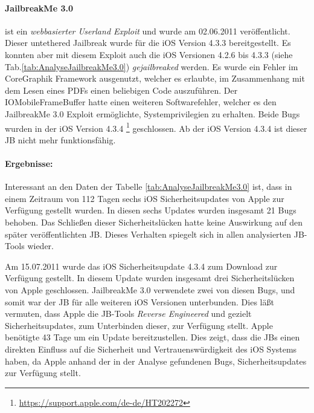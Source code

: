 \paragraph{JailbreakMe 3.0} ist ein \textit{\glqq webbasierter Userland Exploit\grqq{}} und wurde am 02.06.2011 veröffentlicht. Dieser untethered Jailbreak wurde für die iOS Version 4.3.3 bereitgestellt. Es konnten aber mit diesem Exploit auch die iOS Versionen 4.2.6 bis 4.3.3 (siehe Tab.\ref{tab:AnalyseJailbreakMe3.0})  \textit{\glqq gejailbreaked\grqq{}} werden. 
Es wurde ein Fehler im CoreGraphik Framework ausgenutzt, welcher es erlaubte, im Zusammenhang mit dem Lesen eines PDFs einen beliebigen Code auszuführen. Der IOMobileFrameBuffer hatte einen weiteren Softwarefehler, welcher es den JailbreakMe 3.0 Exploit ermöglichte, Systemprivilegien zu erhalten. Beide Bugs wurden in der iOS Version 4.3.4 \footnote{\label{foot:iOS4.3.4}{\url{https://support.apple.com/de-de/HT202272}}} geschlossen. Ab der iOS Version 4.3.4 ist dieser JB nicht mehr funktionsfähig.
 
\paragraph{Ergebnisse:} Interessant an den Daten der Tabelle \ref{tab:AnalyseJailbreakMe3.0} ist, dass in einem Zeitraum von 112 Tagen sechs iOS Sicherheitsupdates von Apple zur Verfügung gestellt wurden. In diesen sechs Updates wurden insgesamt 21 Bugs behoben. Das Schließen dieser Sicherheitslücken hatte keine Auswirkung auf den später veröffentlichten JB. Dieses Verhalten spiegelt sich in allen analysierten JB-Tools wieder. \par  
Am 15.07.2011 wurde das iOS Sicherheitsupdate 4.3.4 zum Download zur Verfügung gestellt. In diesem Update wurden insgesamt drei Sicherheitslücken von Apple geschlossen. JailbreakMe 3.0 verwendete zwei von diesen Bugs, und somit war der JB für alle weiteren iOS Versionen unterbunden. Dies läßt vermuten, dass Apple die JB-Tools \textit{\glqq Reverse Engineered\grqq{}} und gezielt Sicherheitsupdates, zum Unterbinden dieser, zur Verfügung stellt. Apple benötigte 43 Tage um ein Update bereitzustellen. Dies zeigt, dass die JBs einen direkten Einfluss auf die Sicherheit und Vertrauenswürdigkeit des iOS Systems haben, da Apple anhand der in der Analyse gefundenen Bugs, Sicherheitsupdates zur Verfügung stellt. \par 

